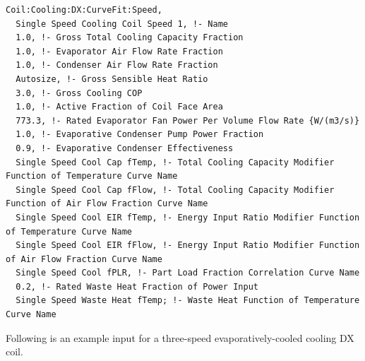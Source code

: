 \begin{lstlisting}
Coil:Cooling:DX:CurveFit:Speed,
  Single Speed Cooling Coil Speed 1, !- Name
  1.0, !- Gross Total Cooling Capacity Fraction
  1.0, !- Evaporator Air Flow Rate Fraction
  1.0, !- Condenser Air Flow Rate Fraction
  Autosize, !- Gross Sensible Heat Ratio
  3.0, !- Gross Cooling COP
  1.0, !- Active Fraction of Coil Face Area
  773.3, !- Rated Evaporator Fan Power Per Volume Flow Rate {W/(m3/s)}
  1.0, !- Evaporative Condenser Pump Power Fraction
  0.9, !- Evaporative Condenser Effectiveness
  Single Speed Cool Cap fTemp, !- Total Cooling Capacity Modifier Function of Temperature Curve Name
  Single Speed Cool Cap fFlow, !- Total Cooling Capacity Modifier Function of Air Flow Fraction Curve Name
  Single Speed Cool EIR fTemp, !- Energy Input Ratio Modifier Function of Temperature Curve Name
  Single Speed Cool EIR fFlow, !- Energy Input Ratio Modifier Function of Air Flow Fraction Curve Name
  Single Speed Cool fPLR, !- Part Load Fraction Correlation Curve Name
  0.2, !- Rated Waste Heat Fraction of Power Input
  Single Speed Waste Heat fTemp; !- Waste Heat Function of Temperature Curve Name

\end{lstlisting}

Following is an example input for a three-speed evaporatively-cooled cooling DX coil.

